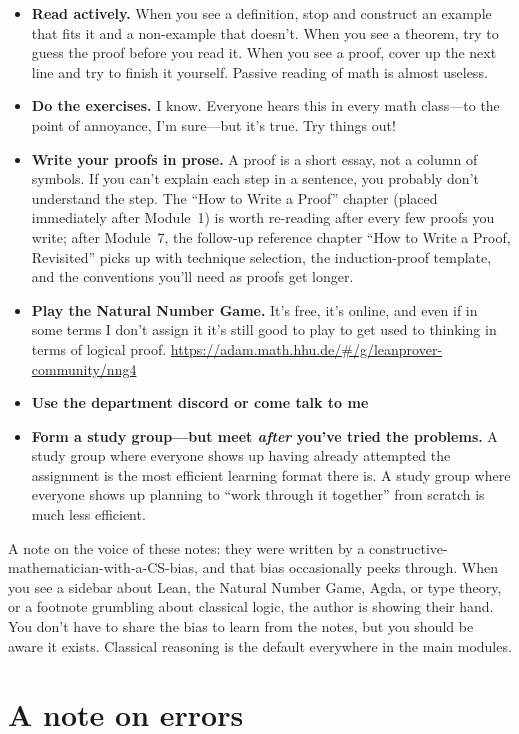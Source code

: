 \documentclass[11pt]{article}
\begin{document}
\begin{itemize}
  \item \textbf{Read actively.} When you see a definition, stop and construct an example that fits it and a non-example that doesn't. When you see a theorem, try to guess the proof before you read it. When you see a proof, cover up the next line and try to finish it yourself. Passive reading of math is almost useless.
  \item \textbf{Do the exercises.} I know. Everyone hears this in every math class---to the point of annoyance, I'm sure---but it's true. Try things out!
  \item \textbf{Write your proofs in prose.} A proof is a short essay, not a column of symbols. If you can't explain each step in a sentence, you probably don't understand the step. The ``How to Write a Proof'' chapter (placed immediately after Module~1) is worth re-reading after every few proofs you write; after Module~7, the follow-up reference chapter ``How to Write a Proof, Revisited'' picks up with technique selection, the induction-proof template, and the conventions you'll need as proofs get longer.
  \item \textbf{Play the Natural Number Game.} It's free, it's online, and even if in some terms I don't assign it it's still good to play to get used to thinking in terms of logical proof. \url{https://adam.math.hhu.de/#/g/leanprover-community/nng4}
  \item \textbf{Use the department discord or come talk to me}
  \item \textbf{Form a study group---but meet \emph{after} you've tried the problems.} A study group where everyone shows up having already attempted the assignment is the most efficient learning format there is. A study group where everyone shows up planning to ``work through it together'' from scratch is much less efficient.
\end{itemize}

A note on the voice of these notes: they were written by a constructive-mathematician-with-a-CS-bias, and that bias occasionally peeks through. When you see a sidebar about Lean, the Natural Number Game, Agda, or type theory, or a footnote grumbling about classical logic, the author is showing their hand. You don't have to share the bias to learn from the notes, but you should be aware it exists. Classical reasoning is the default everywhere in the main modules.

\section*{A note on errors}
\end{document}
